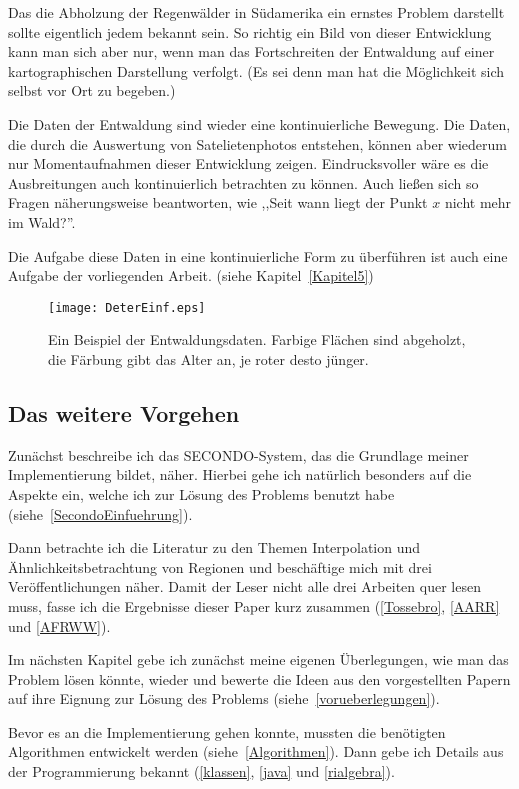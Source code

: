 Das die Abholzung der Regenwälder in Südamerika ein ernstes Problem darstellt sollte eigentlich jedem bekannt sein. So richtig ein Bild von dieser Entwicklung kann man sich aber nur, wenn man das Fortschreiten der Entwaldung auf einer kartographischen Darstellung verfolgt. (Es sei denn man hat die Möglichkeit sich selbst vor Ort zu begeben.) 

Die Daten der Entwaldung sind wieder eine kontinuierliche Bewegung. Die Daten, die durch die Auswertung von Satelietenphotos entstehen, können aber wiederum nur Momentaufnahmen dieser Entwicklung zeigen. Eindrucksvoller wäre es die Ausbreitungen auch kontinuierlich betrachten zu können. Auch ließen sich so Fragen näherungsweise beantworten, wie ,,Seit wann liegt der Punkt $x$ nicht mehr im Wald?''.

Die Aufgabe diese Daten in eine kontinuierliche Form zu überführen ist auch eine Aufgabe der vorliegenden Arbeit. (siehe Kapitel~\ref{Kapitel5})

\begin{figure}
	\centering
	\texttt{[image: DeterEinf.eps]}
	\caption[Ein Beispiel für Entwaldungsdaten]{Ein Beispiel der Entwaldungsdaten. Farbige Flächen sind abgeholzt, die Färbung gibt das Alter an, je roter desto jünger.}
	\label{fig:DeterEinfuehrung}
\end{figure}


\subsection*{Das weitere Vorgehen}

Zunächst beschreibe ich das SECONDO-System, das die Grundlage meiner Implementierung bildet, näher. Hierbei gehe ich natürlich besonders auf die Aspekte ein, welche ich zur Lösung des Problems benutzt habe (siehe~\ref{SecondoEinfuehrung}).

Dann betrachte ich die Literatur zu den Themen Interpolation und Ähnlichkeitsbetrachtung von Regionen und beschäftige mich mit drei Veröffentlichungen näher. Damit der Leser nicht alle drei Arbeiten quer lesen muss, fasse ich die Ergebnisse dieser Paper kurz zusammen (\ref{Tossebro}, \ref{AARR} und \ref{AFRWW}).

Im nächsten Kapitel gebe ich zunächst meine eigenen Überlegungen, wie man das Problem lösen könnte, wieder und bewerte die Ideen aus den vorgestellten Papern auf ihre Eignung zur Lösung des Problems (siehe~\ref{vorueberlegungen}).
 
Bevor es an die Implementierung gehen konnte, mussten die benötigten Algorithmen entwickelt werden (siehe~\ref{Algorithmen}). Dann gebe ich Details aus der Programmierung bekannt (\ref{klassen}, \ref{java} und \ref{rialgebra}).

